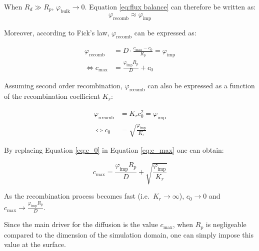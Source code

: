 When $R_d \gg R_p$, $\varphi_\mathrm{bulk} \rightarrow 0$.
Equation \ref{eq:flux balance} can therefore be written as:
\begin{equation}
    \varphi_\mathrm{recomb} \approx \varphi_\mathrm{imp}
    \label{eq:flux balance 2}
\end{equation}

Moreover, according to Fick's law, $\varphi_\mathrm{recomb}$ can be expressed as:

\begin{align}
    \varphi_\mathrm{recomb} &= D \cdot \frac{c_\mathrm{max}-c_{0}}{R_{p}} = \varphi_\mathrm{imp}\\
    \Leftrightarrow c_\mathrm{max} &= \frac{\varphi_\mathrm{imp} R_{p}}{D}+ c_0
    \label{eq:c_max}
\end{align}

Assuming second order recombination, $\varphi_\mathrm{recomb}$ can also be expressed as a function of the recombination coefficient $K_r$:

\begin{align}
    \varphi_\mathrm{recomb} &= K_r c_{0}^{2} = \varphi_\mathrm{imp}\\
    \Leftrightarrow c_{0} &= \sqrt{\frac{\varphi_\mathrm{imp}}{K_r}}
    \label{eq:c_0}
\end{align}

By replacing Equation \ref{eq:c_0} in Equation \ref{eq:c_max} one can obtain:

\begin{equation}
    c_\mathrm{max} = \frac{\varphi_\mathrm{imp} R_{p}}{D}+\sqrt{\frac{\varphi_\mathrm{imp}}{K_r}}
\end{equation}

As the recombination process becomes fast (i.e.\ $K_r \rightarrow \infty$), $c_0 \rightarrow 0$ and $c_\mathrm{max} \rightarrow \frac{\varphi_\mathrm{imp} R_{p}}{D}$.

Since the main driver for the diffusion is the value $c_\mathrm{max}$, when $R_p$ is negligeable compared to the dimension of the simulation domain, one can simply impose this value at the surface.

